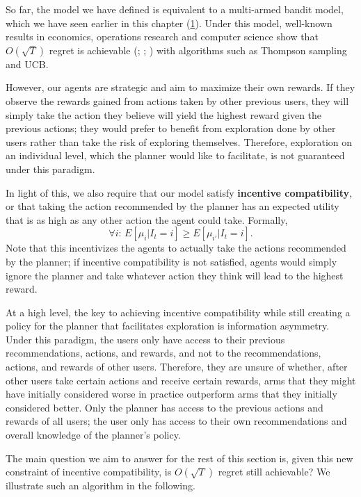 \documentclass[
  letterpaper,
  numbers=noenddot,
  DIV=11]{scrreprt}
\theoremstyle{definition}
\theoremstyle{plain}
\theoremstyle{plain}
\theoremstyle{remark}
\begin{document}
So far, the model we have defined is equivalent to a multi-armed bandit
model, which we have seen earlier in this chapter
(\hyperref[4optim]{1}). Under this model, well-known results in
economics, operations research and computer science show that
\(O(\sqrt{T})\) regret is achievable
(; ; ) with algorithms such as Thompson sampling and UCB.

However, our agents are strategic and aim to maximize their own rewards.
If they observe the rewards gained from actions taken by other previous
users, they will simply take the action they believe will yield the
highest reward given the previous actions; they would prefer to benefit
from exploration done by other users rather than take the risk of
exploring themselves. Therefore, exploration on an individual level,
which the planner would like to facilitate, is not guaranteed under this
paradigm.

In light of this, we also require that our model satisfy
\textbf{incentive compatibility}, or that taking the action recommended
by the planner has an expected utility that is as high as any other
action the agent could take. Formally,
\[\forall i : \, E[\mu_i | I_t = i] \geq E[\mu_{i'} | I_t = i].\] Note
that this incentivizes the agents to actually take the actions
recommended by the planner; if incentive compatibility is not satisfied,
agents would simply ignore the planner and take whatever action they
think will lead to the highest reward.

At a high level, the key to achieving incentive compatibility while
still creating a policy for the planner that facilitates exploration is
information asymmetry. Under this paradigm, the users only have access
to their previous recommendations, actions, and rewards, and not to the
recommendations, actions, and rewards of other users. Therefore, they
are unsure of whether, after other users take certain actions and
receive certain rewards, arms that they might have initially considered
worse in practice outperform arms that they initially considered better.
Only the planner has access to the previous actions and rewards of all
users; the user only has access to their own recommendations and overall
knowledge of the planner's policy.

The main question we aim to answer for the rest of this section is,
given this new constraint of incentive compatibility, is \(O(\sqrt{T})\)
regret still achievable? We illustrate such an algorithm in the
following.
\end{document}
